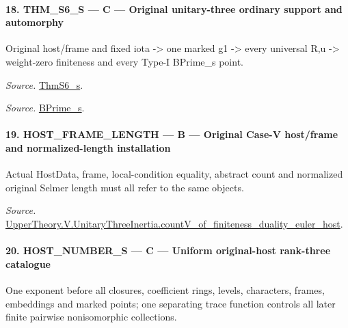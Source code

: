 \documentclass[11pt,a4paper]{article}
\numberwithin{equation}{section}
\theoremstyle{remark}\newtheorem{remark}[theorem]{Remark}
\begin{document}
\paragraph{18. THM\_\allowbreak S6\_\allowbreak S — C — Original unitary-three ordinary support and automorphy}

Original host/frame and fixed iota -> one marked g1 -> every universal R,u -> weight-zero finiteness and every Type-I BPrime\_\allowbreak s point.

\emph{Source.} \href{https://github.com/CocoSgt/riemann-hypothesis-lean/blob/7cbf7a0c32fca1badf05931879a37c3f8a2b03b4/src/Development/AutomorphicArithmetic/AutomorphicVarieties/ModularityArgument/ThresholdArguments/DenseThresholdCases/ThmS6CoreS.lean#L17-L26}{ThmS6\_\allowbreak s}.

\emph{Source.} \href{https://github.com/CocoSgt/riemann-hypothesis-lean/blob/7cbf7a0c32fca1badf05931879a37c3f8a2b03b4/src/Development/AutomorphicArithmetic/AutomorphicVarieties/ModularityArgument/ThresholdArguments/DenseThresholdCases/ThmS6CoreS.lean#L12-L16}{BPrime\_\allowbreak s}.



\paragraph{19. HOST\_\allowbreak FRAME\_\allowbreak LENGTH — B — Original Case-V host/frame and normalized-length installation}

Actual HostData, frame, local-condition equality, abstract count and normalized original Selmer length must all refer to the same objects.

\emph{Source.} \href{https://github.com/CocoSgt/riemann-hypothesis-lean/blob/7cbf7a0c32fca1badf05931879a37c3f8a2b03b4/src/Development/AutomorphicArithmetic/AutomorphicVarieties/ModularityArgument/ThresholdArguments/DenseThresholdCases/CountVOf.lean#L33-L60}{UpperTheory.V.UnitaryThreeInertia.countV\_\allowbreak of\_\allowbreak finiteness\_\allowbreak duality\_\allowbreak euler\_\allowbreak host}.



\paragraph{20. HOST\_\allowbreak NUMBER\_\allowbreak S — C — Uniform original-host rank-three catalogue}

One exponent before all closures, coefficient rings, levels, characters, frames, embeddings and marked points; one separating trace function controls all later finite pairwise nonisomorphic collections.
\end{document}
